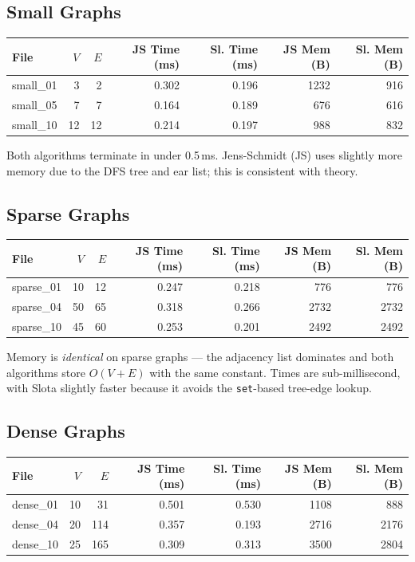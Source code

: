 \documentclass[12pt,a4paper]{article}
\newcommand{\code}[1]{\texttt{#1}}
\begin{document}
\subsection{Small Graphs}

\begin{center}
\begin{tabular}{|l|r|r|r|r|r|r|}
\hline
File & $V$ & $E$ & JS Time (ms) & Sl. Time (ms) & JS Mem (B) & Sl. Mem (B) \\ \hline
small\_01 &  3 &  2 & 0.302 & 0.196 & 1232 &  916 \\ \hline
small\_05 &  7 &  7 & 0.164 & 0.189 &  676 &  616 \\ \hline
small\_10 & 12 & 12 & 0.214 & 0.197 &  988 &  832 \\ \hline
\end{tabular}
\end{center}

Both algorithms terminate in under 0.5\,ms.  Jens-Schmidt (JS) uses
slightly more memory due to the DFS tree and ear list; this is consistent
with theory.

\subsection{Sparse Graphs}

\begin{center}
\begin{tabular}{|l|r|r|r|r|r|r|}
\hline
File & $V$ & $E$ & JS Time (ms) & Sl. Time (ms) & JS Mem (B) & Sl. Mem (B) \\ \hline
sparse\_01 & 10 & 12 & 0.247 & 0.218 &  776 &  776 \\ \hline
sparse\_04 & 50 & 65 & 0.318 & 0.266 & 2732 & 2732 \\ \hline
sparse\_10 & 45 & 60 & 0.253 & 0.201 & 2492 & 2492 \\ \hline
\end{tabular}
\end{center}

Memory is \emph{identical} on sparse graphs --- the adjacency list
dominates and both algorithms store $O(V+E)$ with the same constant.
Times are sub-millisecond, with Slota slightly faster because it avoids
the \code{set}-based tree-edge lookup.

\subsection{Dense Graphs}

\begin{center}
\begin{tabular}{|l|r|r|r|r|r|r|}
\hline
File & $V$ & $E$ & JS Time (ms) & Sl. Time (ms) & JS Mem (B) & Sl. Mem (B) \\ \hline
dense\_01 & 10 &  31 & 0.501 & 0.530 & 1108 &  888 \\ \hline
dense\_04 & 20 & 114 & 0.357 & 0.193 & 2716 & 2176 \\ \hline
dense\_10 & 25 & 165 & 0.309 & 0.313 & 3500 & 2804 \\ \hline
\end{tabular}
\end{center}
\end{document}
